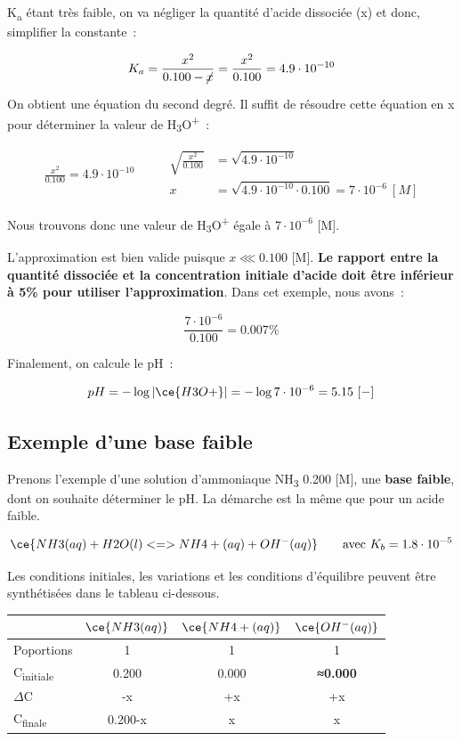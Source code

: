 \documentclass[
  11pt,
  a4paper,
  openany]{book}
\begin{document}
K\textsubscript{a} étant très faible, on va négliger la quantité d'acide dissociée (x) et donc, simplifier la constante~:

\[
K_a = \frac{x^2}{0.100 - \cancel{x}} = \frac{x^2}{0.100} = 4.9 \cdot 10^{-10}
\]

On obtient une équation du second degré. Il suffit de résoudre cette équation en x pour déterminer la valeur de \textbar H\textsubscript{3}O\textsuperscript{+}\textbar~:

\[
\begin{split}
\frac{x^2}{0.100} = 4.9 \cdot 10^{-10}
\end{split}
\qquad
\begin{split}
\sqrt{\frac{x^2}{0.100}} &= \sqrt{4.9 \cdot 10^{-10}} \\
x &= \sqrt{4.9 \cdot 10^{-10} \cdot 0.100} = 7 \cdot 10^{-6}\ [M]
\end{split}
\]

Nous trouvons donc une valeur de \textbar H\textsubscript{3}O\textsuperscript{+}\textbar{} égale à \(7 \cdot 10^{-6}\) {[}M{]}.

L'approximation est bien valide puisque \(x \lll 0.100\) {[}M{]}. \textbf{Le rapport entre la quantité dissociée et la concentration initiale d'acide doit être inférieur à 5\% pour utiliser l'approximation}. Dans cet exemple, nous avons~:

\[
\frac{7 \cdot 10^{-6}}{0.100} = 0.007\%
\]

Finalement, on calcule le pH~:

\[
pH = - \log |\ce{H3O+}| = - \log 7 \cdot 10^{-6} = 5.15\ [-]
\]

\subsection{Exemple d'une base faible}\label{exemple-dune-base-faible}

Prenons l'exemple d'une solution d'ammoniaque NH\textsubscript{3} 0.200 {[}M{]}, une \textbf{base faible}, dont on souhaite déterminer le pH. La démarche est la même que pour un acide faible.

\[
\ce{NH3(aq) + H2O(l) <=> NH4+(aq) + OH^{-}(aq)} \qquad \text{avec } K_b = 1.8 \cdot 10^{-5}
\]

Les conditions initiales, les variations et les conditions d'équilibre peuvent être synthétisées dans le tableau ci-dessous.

\begin{longtable}[]{@{}lccc@{}}
\toprule\noalign{}
& \(\ce{NH3(aq)}\) & \(\ce{NH4+(aq)}\) & \(\ce{OH^{-}(aq)}\) \\
\midrule\noalign{}
\endhead
\bottomrule\noalign{}
\endlastfoot
Poportions & 1 & 1 & 1 \\
C\textsubscript{initiale} & 0.200 & 0.000 & \textbf{≈0.000} \\
\(\Delta\)C & -x & +x & +x \\
C\textsubscript{finale} & 0.200-x & x & x \\
\end{longtable}
\end{document}
